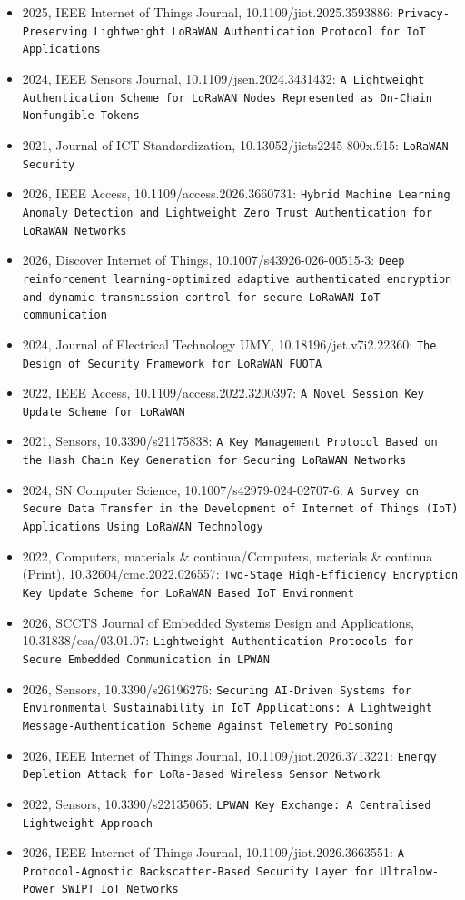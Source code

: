 \begin{itemize}
\item 2025, IEEE Internet of Things Journal, 10.1109/jiot.2025.3593886: \texttt{Privacy-Preserving Lightweight LoRaWAN Authentication Protocol for IoT Applications}
\item 2024, IEEE Sensors Journal, 10.1109/jsen.2024.3431432: \texttt{A Lightweight Authentication Scheme for LoRaWAN Nodes Represented as On-Chain Nonfungible Tokens}
\item 2021, Journal of ICT Standardization, 10.13052/jicts2245-800x.915: \texttt{LoRaWAN Security}
\item 2026, IEEE Access, 10.1109/access.2026.3660731: \texttt{Hybrid Machine Learning Anomaly Detection and Lightweight Zero Trust Authentication for LoRaWAN Networks}
\item 2026, Discover Internet of Things, 10.1007/s43926-026-00515-3: \texttt{Deep reinforcement learning-optimized adaptive authenticated encryption and dynamic transmission control for secure LoRaWAN IoT communication}
\item 2024, Journal of Electrical Technology UMY, 10.18196/jet.v7i2.22360: \texttt{The Design of Security Framework for LoRaWAN FUOTA}
\item 2022, IEEE Access, 10.1109/access.2022.3200397: \texttt{A Novel Session Key Update Scheme for LoRaWAN}
\item 2021, Sensors, 10.3390/s21175838: \texttt{A Key Management Protocol Based on the Hash Chain Key Generation for Securing LoRaWAN Networks}
\item 2024, SN Computer Science, 10.1007/s42979-024-02707-6: \texttt{A Survey on Secure Data Transfer in the Development of Internet of Things (IoT) Applications Using LoRaWAN Technology}
\item 2022, Computers, materials \& continua/Computers, materials \& continua (Print), 10.32604/cmc.2022.026557: \texttt{Two-Stage High-Efficiency Encryption Key Update Scheme for LoRaWAN Based IoT Environment}
\item 2026, SCCTS Journal of Embedded Systems Design and Applications, 10.31838/esa/03.01.07: \texttt{Lightweight Authentication Protocols for Secure Embedded Communication in LPWAN}
\item 2026, Sensors, 10.3390/s26196276: \texttt{Securing AI-Driven Systems for Environmental Sustainability in IoT Applications: A Lightweight Message-Authentication Scheme Against Telemetry Poisoning}
\item 2026, IEEE Internet of Things Journal, 10.1109/jiot.2026.3713221: \texttt{Energy Depletion Attack for LoRa-Based Wireless Sensor Network}
\item 2022, Sensors, 10.3390/s22135065: \texttt{LPWAN Key Exchange: A Centralised Lightweight Approach}
\item 2026, IEEE Internet of Things Journal, 10.1109/jiot.2026.3663551: \texttt{A Protocol-Agnostic Backscatter-Based Security Layer for Ultralow-Power SWIPT IoT Networks}
\end{itemize}

